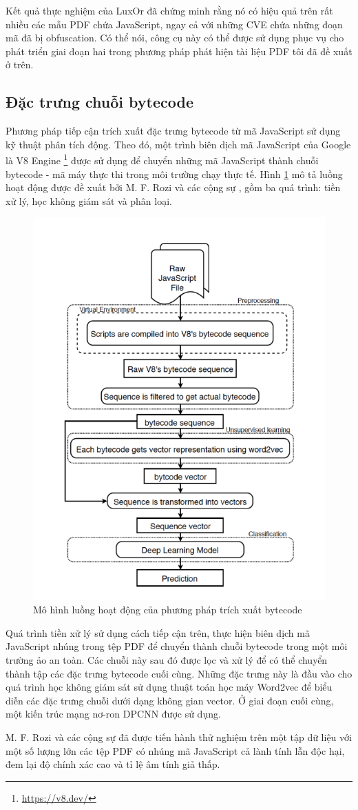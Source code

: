 \documentclass[./../main.tex]{subfiles}
\begin{document}
Kết quả thực nghiệm của LuxOr đã chứng minh rằng nó có hiệu quả trên rất nhiều các mẫu PDF chứa JavaScript, ngay cả với những CVE chứa những đoạn mã đã bị obfuscation. Có thể nói, công cụ này có thể được sử dụng phục vụ cho phát triển giai đoạn hai trong phương pháp phát hiện tài liệu PDF tôi đã đề xuất ở trên.

\subsection{Đặc trưng chuỗi bytecode}
Phương pháp tiếp cận trích xuất đặc trưng bytecode từ mã JavaScript sử dụng kỹ thuật phân tích động. Theo đó, một trình biên dịch mã JavaScript của Google là V8 Engine \footnote{\url{https://v8.dev/}} được sử dụng để chuyển những mã JavaScript thành chuỗi bytecode - mã máy thực thi trong môi trường chạy thực tế. Hình \ref{fig:bytecode_flow} mô tả luồng hoạt động được đề xuất bởi M. F. Rozi và các cộng sự \cite{bytecode}, gồm ba quá trình: tiền xử lý, học không giám sát và phân loại.


\begin{figure}[H]
	\centering
	\includegraphics[width=0.7\linewidth]{./images/bytecode_flow.png}
	\caption{Mô hình luồng hoạt động của phương pháp trích xuất bytecode \cite{bytecode}}
	\label{fig:bytecode_flow}
\end{figure}

Quá trình tiền xử lý sử dụng cách tiếp cận trên, thực hiện biên dịch mã JavaScript nhúng trong tệp PDF để chuyển thành chuỗi bytecode trong một môi trường ảo an toàn. Các chuỗi này sau đó được lọc và xử lý để có thể chuyển thành tập các đặc trưng bytecode cuối cùng. Những đặc trưng này là đầu vào cho quá trình học không giám sát sử dụng thuật toán học máy Word2vec để biểu diễn các đặc trưng chuỗi dưới dạng không gian vector. Ở giai đoạn cuối cùng, một kiến trúc mạng nơ-ron DPCNN \cite{dpcnn} được sử dụng.

M. F. Rozi và các cộng sự đã được tiến hành thử nghiệm trên một tập dữ liệu với một số lượng lớn các tệp PDF có nhúng mã JavaScript cả lành tính lẫn độc hại, đem lại độ chính xác cao và tỉ lệ âm tính giả thấp.
\end{document}
